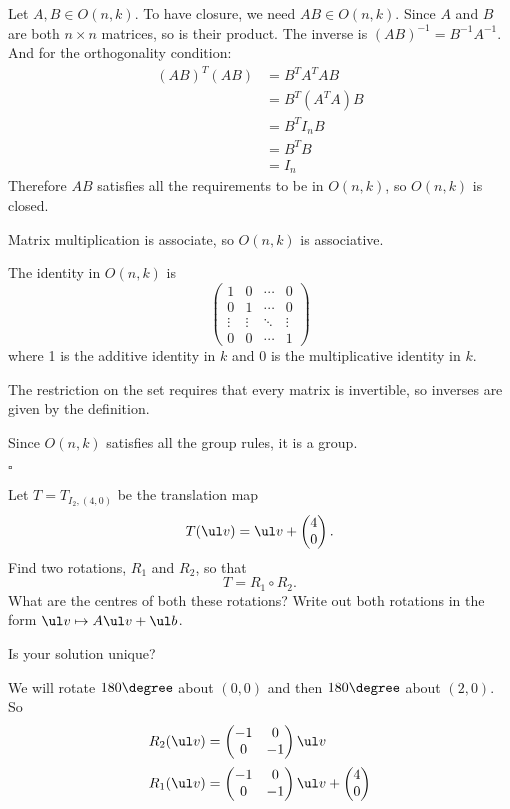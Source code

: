 \documentclass[a4paper]{article}
\begin{document}
Let $A, B \in O(n, k)$. To have closure, we need $AB \in O(n, k)$. Since $A$ and $B$ are both $n \times n$ matrices, so is their product. The inverse is ${(AB)}^{-1} = B^{-1} A^{-1}$. And for the orthogonality condition:
\begin{align*}
{(AB)}^T (AB) &= B^T A^T A B \\
&= B^T (A^T A) B \\
&= B^T I_n B \\
&= B^T B \\
&= I_n
\end{align*}
Therefore $AB$ satisfies all the requirements to be in $O(n, k)$, so $O(n, k)$ is closed.

Matrix multiplication is associate, so $O(n, k)$ is associative.

The identity in $O(n, k)$ is \[ \begin{pmatrix}
    1 & 0 & \cdots & 0 \\
    0 & 1 & \cdots & 0 \\
    \vdots & \vdots & \ddots & \vdots \\
    0 & 0 & \cdots & 1
\end{pmatrix} \] where 1 is the additive identity in $k$ and 0 is the multiplicative identity in $k$.

The restriction on the set requires that every matrix is invertible, so inverses are given by the definition.

Since $O(n, k)$ satisfies all the group rules, it is a group.

\hfill $\square$



\begin{questionbody}
%
Let $T = T_{I_2, (4, 0)}$ be the translation map \[
T(\ul v) = \ul v + \begin{pmatrix} 4 \\ 0 \end{pmatrix}.
\] Find two rotations, $R_1$ and $R_2$, so that \[
T = R_1 \circ R_2.
\] What are the centres of both these rotations? Write out both rotations in the form $\ul v \mapsto A \ul v + \ul b$.

Is your solution unique?
\end{questionbody}

We will rotate $180\degree$ about $(0,0)$ and then $180\degree$ about $(2,0)$. So
\begin{align*}
R_2(\ul v) &= \begin{pmatrix} -1 & 0 \\ 0 & -1 \end{pmatrix} \ul v \\[0.5ex]
R_1(\ul v) &= \begin{pmatrix} -1 & 0 \\ 0 & -1 \end{pmatrix} \ul v + \begin{pmatrix} 4 \\ 0 \end{pmatrix}
\end{align*}
\end{document}
